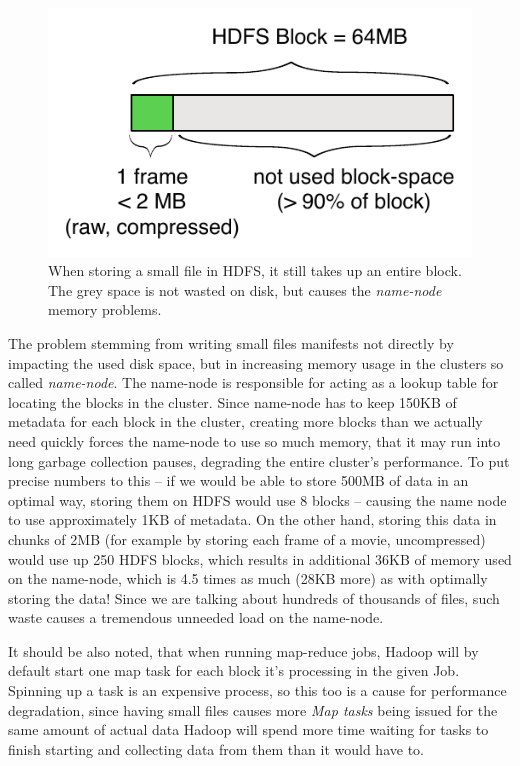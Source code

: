 \begin{figure}[ch!]
  \centering
  \includegraphics[scale=0.9]{diagrams/no-sequence-file.pdf}
  \caption{When storing a small file in HDFS, it still takes up an entire block. The grey space is not wasted on disk, but causes the \textit{name-node} memory problems.}
  \label{fig:no-sequence-file}
\end{figure}

The problem stemming from writing small files manifests not directly by impacting the used disk space, but in increasing memory usage in the clusters so called \textit{name-node}. The name-node is responsible for acting as a lookup table for locating the blocks in the cluster. Since name-node has to keep 150KB of metadata for each block in the cluster, creating more blocks than we actually need quickly forces the name-node to use so much memory, that it may run into long garbage collection pauses, degrading the entire cluster's performance. To put precise numbers to this -- if we would be able to store 500MB of data in an optimal way, storing them on HDFS would use 8 blocks -- causing the name node to use approximately 1KB of metadata. On the other hand, storing this data in chunks of 2MB (for example by storing each frame of a movie, uncompressed) would use up 250 HDFS blocks, which results in additional 36KB of memory used on the name-node, which is 4.5 times as much (28KB more) as with optimally storing the data! Since we are talking about hundreds of thousands of files, such waste causes a tremendous unneeded load on the name-node.

It should be also noted, that when running map-reduce jobs, Hadoop will by default start one map task for each block it's processing in the given Job. Spinning up a task is an expensive process, so this too is a cause for performance degradation, since having small files causes more \textit{Map tasks} being issued for the same amount of actual data Hadoop will spend more time waiting for tasks to finish starting and collecting data from them than it would have to.


